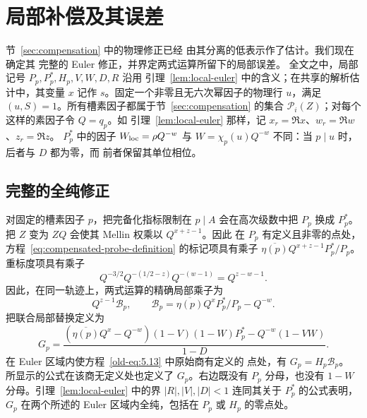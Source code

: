 \documentclass[11pt,a4paper]{article}
\numberwithin{equation}{section}
\numberwithin{figure}{section}
\theoremstyle{definition}
\theoremstyle{remark}
\begin{document}
\section{局部补偿及其误差}
\label{sec:local-compensation}

节~\ref{sec:compensation} 中的物理修正已经
由其分离的低表示作了估计。我们现在确定其
完整的 Euler 修正，并界定两式运算所留下的局部误差。
全文之中，局部记号 $P_p,P_p^*,H_p,V,W,D,R$ 沿用
引理~\ref{lem:local-euler} 中的含义；在共享的解析估计中，其变量
$x$ 记作 $s$。固定一个非零且无六次幂因子的物理行 $u$，满足
$(u,S)=1$。所有槽素因子都属于节~\ref{sec:compensation}
的集合 $\mathcal P_i(Z)$；对每个这样的素因子令 $Q=q_p$。如
引理~\ref{lem:local-euler} 那样，记 $x_r=\Re x$、$w_r=\Re w$、$z_r=\Re z$。
$P_p^*$ 中的因子 $W_{\rm loc}=\rho Q^{-w}$ 与
$W=\chi_p(u)Q^{-w}$ 不同：当 $p\mid u$ 时，后者与 $D$ 都为零，而
前者保留其单位相位。

\subsection{完整的全纯修正}

对固定的槽素因子 $p$，把完备化指标限制在
$p\mid A$ 会在高次级数中把 $P_p$ 换成 $P_p^*$。把
$Z$ 变为 $ZQ$ 会使其 Mellin 权乘以 $Q^{x+z-1}$。因此
在 $P_p$ 有定义且非零的点处，方程~\eqref{eq:compensated-probe-definition}
的标记项具有乘子
$\overline{\eta(p)}Q^{x+z-1}P_p^*/P_p$。重标度项具有乘子
\[
 Q^{-3/2}Q^{-(1/2-z)}Q^{-(w-1)}=Q^{z-w-1}.
\]
因此，在同一轨迹上，两式运算的精确局部乘子为
\begin{equation}\label{old-eq:5.13}
 Q^{z-1}\mathcal B_p,\qquad
 \mathcal B_p=\overline{\eta(p)}Q^xP_p^*/P_p-Q^{-w}.
\end{equation}
把联合局部替换定义为
\begin{equation}\label{old-eq:5.13c}
 G_p=
 \frac{(\overline{\eta(p)}Q^x-Q^{-w})(1-V)(1-W)P_p^*
       -Q^{-w}(1-VW)}{1-D}.
\end{equation}
在 Euler 区域内使方程~\eqref{old-eq:5.13} 中原始商有定义的
点处，有 $G_p=H_p\mathcal B_p$。
所显示的公式在该商无定义处也定义了
$G_p$。右边既没有 $P_p$
分母，也没有 $1-W$ 分母。引理~\ref{lem:local-euler} 中的界 $|R|,|V|,|D|<1$
连同其关于 $P_p^*$ 的公式表明，
$G_p$ 在两个所述的 Euler 区域内全纯，包括在 $P_p$ 或 $H_p$
的零点处。
\end{document}
